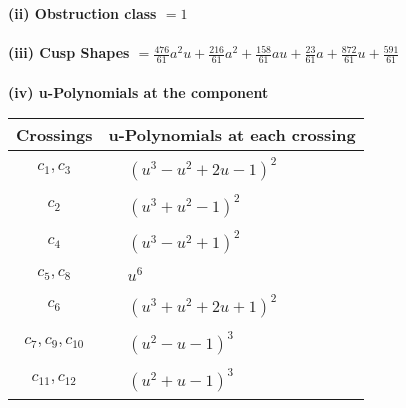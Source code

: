 \documentclass[1p]{elsarticle_modified}
\theoremstyle{definition}
\begin{document}
\flushleft \textbf{(ii) Obstruction class $= 1$}\\~\\
\flushleft \textbf{(iii) Cusp Shapes $= \frac{476}{61} a^2 u+\frac{216}{61} a^2+\frac{158}{61} a u+\frac{23}{61} a+\frac{872}{61} u+\frac{591}{61}$}\\~\\
\newpage\renewcommand{\arraystretch}{1}
\flushleft \textbf{(iv) u-Polynomials at the component}\newline \\
\begin{tabular}{m{50pt}|m{274pt}}
Crossings & \hspace{64pt}u-Polynomials at each crossing \\
\hline $$\begin{aligned}c_{1},c_{3}\end{aligned}$$&$\begin{aligned}
&(u^3- u^2+2 u-1)^2
\end{aligned}$\\
\hline $$\begin{aligned}c_{2}\end{aligned}$$&$\begin{aligned}
&(u^3+u^2-1)^2
\end{aligned}$\\
\hline $$\begin{aligned}c_{4}\end{aligned}$$&$\begin{aligned}
&(u^3- u^2+1)^2
\end{aligned}$\\
\hline $$\begin{aligned}c_{5},c_{8}\end{aligned}$$&$\begin{aligned}
&u^6
\end{aligned}$\\
\hline $$\begin{aligned}c_{6}\end{aligned}$$&$\begin{aligned}
&(u^3+u^2+2 u+1)^2
\end{aligned}$\\
\hline $$\begin{aligned}c_{7},c_{9},c_{10}\end{aligned}$$&$\begin{aligned}
&(u^2- u-1)^3
\end{aligned}$\\
\hline $$\begin{aligned}c_{11},c_{12}\end{aligned}$$&$\begin{aligned}
&(u^2+u-1)^3
\end{aligned}$\\
\hline
\end{tabular}\\~\\
\end{document}
